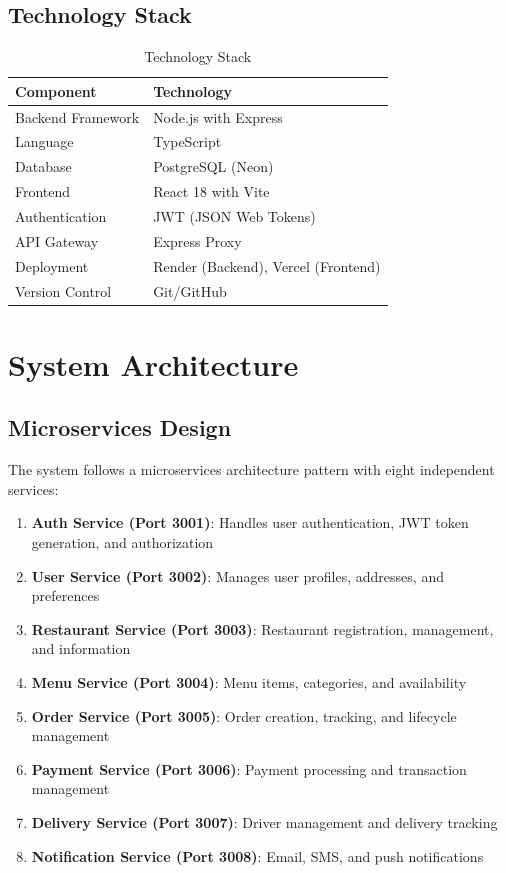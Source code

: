 \documentclass[12pt,a4paper]{article}
\begin{document}
\subsection{Technology Stack}
\begin{table}[H]
\centering
\begin{tabular}{@{}ll@{}}
\toprule
\textbf{Component} & \textbf{Technology} \\ \midrule
Backend Framework & Node.js with Express \\
Language & TypeScript \\
Database & PostgreSQL (Neon) \\
Frontend & React 18 with Vite \\
Authentication & JWT (JSON Web Tokens) \\
API Gateway & Express Proxy \\
Deployment & Render (Backend), Vercel (Frontend) \\
Version Control & Git/GitHub \\ \bottomrule
\end{tabular}
\caption{Technology Stack}
\end{table}

\section{System Architecture}

\subsection{Microservices Design}

The system follows a microservices architecture pattern with eight independent services:

\begin{enumerate}
    \item \textbf{Auth Service (Port 3001)}: Handles user authentication, JWT token generation, and authorization
    \item \textbf{User Service (Port 3002)}: Manages user profiles, addresses, and preferences
    \item \textbf{Restaurant Service (Port 3003)}: Restaurant registration, management, and information
    \item \textbf{Menu Service (Port 3004)}: Menu items, categories, and availability
    \item \textbf{Order Service (Port 3005)}: Order creation, tracking, and lifecycle management
    \item \textbf{Payment Service (Port 3006)}: Payment processing and transaction management
    \item \textbf{Delivery Service (Port 3007)}: Driver management and delivery tracking
    \item \textbf{Notification Service (Port 3008)}: Email, SMS, and push notifications
\end{enumerate}
\end{document}
